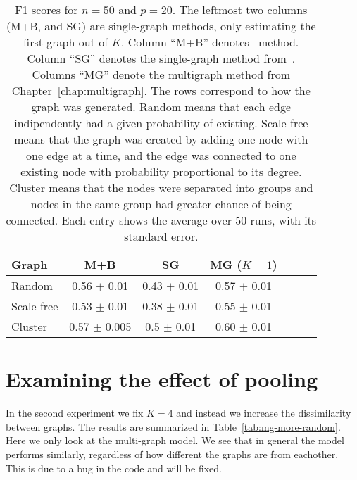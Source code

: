 \documentclass[a4paper, 11pt, oneside]{report}
\newcommand{\1}{\mathds{1}}
\begin{document}
\begin{table}[ht]
  \caption{F1 scores for $n=50$ and $p=20$.
  The leftmost two columns (M+B, and SG) are single-graph methods,
only estimating the first graph out of $K$.
Column ``M+B'' denotes~\citet{mein2006} method.
Column ``SG'' denotes the single-graph method from~\citet{limcco-2017}.
Columns ``MG'' denote the multigraph method from Chapter~\ref{chap:multigraph}.
The rows correspond to how the graph was generated. 
Random means that each edge indipendently had a given probability of existing.
Scale-free means that the graph was created by adding one node with one edge at a time, and the edge was connected to one existing node with probability proportional to its degree.
Cluster means that the nodes were separated into groups and nodes in the same group had greater chance of being connected.
Each entry shows the average over 50 runs, with its standard error. }
  \label{tab:mg-more-graphs}
  \begin{center}
    \begin{tabular}[c]{l|cccccc}
      \toprule
      Graph & M+B & SG & MG ($K = 1$) \\
      \midrule
      Random & 0.56 $\pm$ 0.01 & 0.43 $\pm$ 0.01 & 0.57 $\pm$ 0.01 \\
      \midrule
      Scale-free & 0.53 $\pm$ 0.01 & 0.38 $\pm$ 0.01 & 0.55 $\pm$ 0.01 \\
      \midrule
      Cluster & 0.57 $\pm$ 0.005 & 0.5 $\pm$ 0.01 & 0.60 $\pm$ 0.01 \\
      \bottomrule
    \end{tabular}
  \end{center}
\end{table}

\section{Examining the effect of pooling}\label{sect:perf-self}
In the second experiment we fix $K=4$ and instead we increase the dissimilarity between graphs.
The results are summarized in Table~\ref{tab:mg-more-random}. 
Here we only look at the multi-graph model.
We see that in general the model performs similarly,
regardless of how different the graphs are from eachother.
This is due to a bug in the code and will be fixed.
\end{document}

